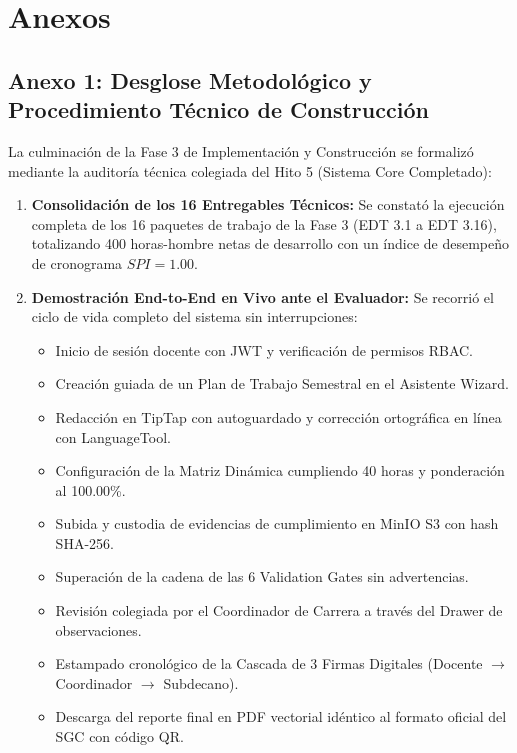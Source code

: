 \documentclass[12pt,a4paper]{article}
\begin{document}
\vspace{0.4cm}

\section{Anexos}

\subsection*{Anexo 1: Desglose Metodológico y Procedimiento Técnico de Construcción}
La culminación de la Fase 3 de Implementación y Construcción se formalizó mediante la auditoría técnica colegiada del Hito 5 (Sistema Core Completado):

\begin{enumerate}[leftmargin=1.5em, itemsep=3pt]
    \item \textbf{Consolidación de los 16 Entregables Técnicos:} Se constató la ejecución completa de los 16 paquetes de trabajo de la Fase 3 (EDT 3.1 a EDT 3.16), totalizando 400 horas-hombre netas de desarrollo con un índice de desempeño de cronograma $SPI = 1.00$.
    \item \textbf{Demostración End-to-End en Vivo ante el Evaluador:} Se recorrió el ciclo de vida completo del sistema sin interrupciones:
    \begin{itemize}[leftmargin=1.2em, itemsep=2pt]
        \item Inicio de sesión docente con JWT y verificación de permisos RBAC.
        \item Creación guiada de un Plan de Trabajo Semestral en el Asistente Wizard.
        \item Redacción en TipTap con autoguardado y corrección ortográfica en línea con LanguageTool.
        \item Configuración de la Matriz Dinámica cumpliendo 40 horas y ponderación al 100.00\%.
        \item Subida y custodia de evidencias de cumplimiento en MinIO S3 con hash SHA-256.
        \item Superación de la cadena de las 6 Validation Gates sin advertencias.
        \item Revisión colegiada por el Coordinador de Carrera a través del Drawer de observaciones.
        \item Estampado cronológico de la Cascada de 3 Firmas Digitales (Docente $\to$ Coordinador $\to$ Subdecano).
        \item Descarga del reporte final en PDF vectorial idéntico al formato oficial del SGC con código QR.

\end{itemize}
\end{enumerate}
\end{document}
